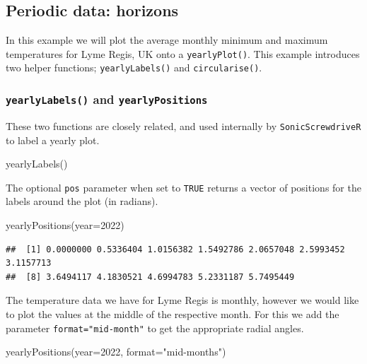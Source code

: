 \documentclass[
]{book}
\newenvironment{Shaded}{\begin{snugshade}}{\end{snugshade}}
\newcommand{\AttributeTok}[1]{\textcolor[rgb]{0.77,0.63,0.00}{#1}}
\newcommand{\DecValTok}[1]{\textcolor[rgb]{0.00,0.00,0.81}{#1}}
\newcommand{\FunctionTok}[1]{\textcolor[rgb]{0.00,0.00,0.00}{#1}}
\newcommand{\NormalTok}[1]{#1}
\newcommand{\StringTok}[1]{\textcolor[rgb]{0.31,0.60,0.02}{#1}}
\begin{document}
\hypertarget{periodic-data-horizons}{%
\subsection{Periodic data: horizons}\label{periodic-data-horizons}}

In this example we will plot the average monthly minimum and maximum temperatures for Lyme Regis, UK onto a \texttt{yearlyPlot()}. This example introduces two helper functions; \texttt{yearlyLabels()} and \texttt{circularise()}.

\hypertarget{yearlylabels-and-yearlypositions}{%
\subsubsection{\texorpdfstring{\texttt{yearlyLabels()} and \texttt{yearlyPositions}}{yearlyLabels() and yearlyPositions}}\label{yearlylabels-and-yearlypositions}}

These two functions are closely related, and used internally by \texttt{SonicScrewdriveR} to label a yearly plot.

\begin{Shaded}
\begin{Highlighting}[]
\FunctionTok{yearlyLabels}\NormalTok{()}
\end{Highlighting}
\end{Shaded}

The optional \texttt{pos} parameter when set to \texttt{TRUE} returns a vector of positions for the labels around the plot (in radians).

\begin{Shaded}
\begin{Highlighting}[]
\FunctionTok{yearlyPositions}\NormalTok{(}\AttributeTok{year=}\DecValTok{2022}\NormalTok{)}
\end{Highlighting}
\end{Shaded}

\begin{verbatim}
##  [1] 0.0000000 0.5336404 1.0156382 1.5492786 2.0657048 2.5993452 3.1157713
##  [8] 3.6494117 4.1830521 4.6994783 5.2331187 5.7495449
\end{verbatim}

The temperature data we have for Lyme Regis is monthly, however we would like to plot the values at the middle of the respective month. For this we add the parameter \texttt{format="mid-month"} to get the appropriate radial angles.

\begin{Shaded}
\begin{Highlighting}[]
\FunctionTok{yearlyPositions}\NormalTok{(}\AttributeTok{year=}\DecValTok{2022}\NormalTok{, }\AttributeTok{format=}\StringTok{"mid{-}months"}\NormalTok{)}
\end{Highlighting}
\end{Shaded}
\end{document}

